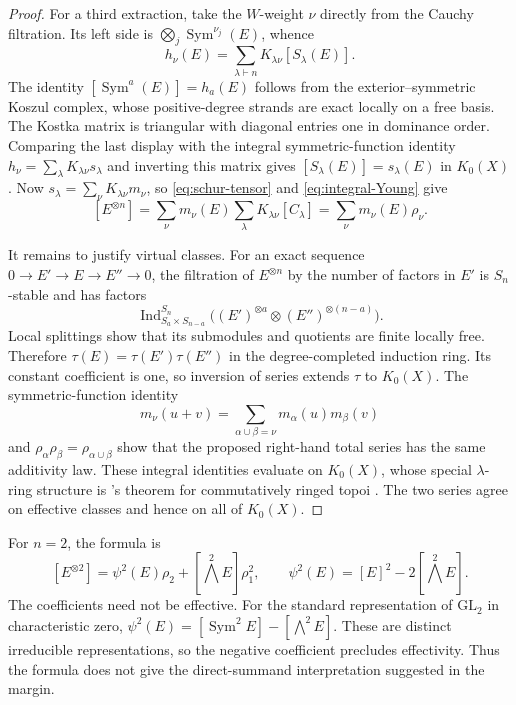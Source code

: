 \begin{proof}
For a third extraction, take the $W$-weight $\nu$ directly from
the Cauchy filtration.  Its left side is
$\bigotimes_j\operatorname{Sym}^{\nu_j}(E)$, whence
\[
 h_\nu(E)=\sum_{\lambda\vdash n}K_{\lambda\nu}[S_\lambda(E)].
\]
The identity $[\operatorname{Sym}^a(E)]=h_a(E)$ follows from
the exterior--symmetric Koszul complex, whose positive-degree
strands are exact locally on a free basis.  The Kostka matrix is
triangular with diagonal entries one in dominance order.  Comparing
the last display with the integral symmetric-function identity
$h_\nu=\sum_\lambda K_{\lambda\nu}s_\lambda$ and inverting this
matrix gives $[S_\lambda(E)]=s_\lambda(E)$ in $K_0(X)$.
Now $s_\lambda=\sum_\nu K_{\lambda\nu}m_\nu$, so
\eqref{eq:schur-tensor} and \eqref{eq:integral-Young} give
\[
 [E^{\otimes n}]
 =\sum_\nu m_\nu(E)\sum_\lambda K_{\lambda\nu}[C_\lambda]
 =\sum_\nu m_\nu(E)\rho_\nu.
\]

It remains to justify virtual classes.  For an exact sequence
$0\to E'\to E\to E''\to0$, the filtration of $E^{\otimes n}$
by the number of factors in $E'$ is $S_n$-stable and has factors
\[
 \operatorname{Ind}_{S_a\times S_{n-a}}^{S_n}
 \bigl((E')^{\otimes a}\otimes(E'')^{\otimes(n-a)}\bigr).
\]
Local splittings show that its submodules and quotients are
finite locally free.  Therefore $\tau(E)=\tau(E')\tau(E'')$
in the degree-completed induction ring.  Its constant coefficient
is one, so inversion of series extends $\tau$ to $K_0(X)$.
The symmetric-function identity
\[
 m_\nu(u+v)=\sum_{\alpha\cup\beta=\nu}m_\alpha(u)m_\beta(v)
\]
and $\rho_\alpha\rho_\beta=\rho_{\alpha\cup\beta}$ show that
the proposed right-hand total series has the same additivity
law.  These integral identities evaluate on $K_0(X)$, whose
special $\lambda$-ring structure is
\citeauthor{SGA6}'s theorem for commutatively ringed topoi
\citep[Expos\'e~VI, Theorem~3.3, pp.~392--393]{SGA6}.
The two series agree on effective classes and hence on all of
$K_0(X)$.
\end{proof}

For $n=2$, the formula is
\[
 [E^{\otimes2}]=\psi^2(E)\rho_2+
 [\bigwedge^2E]\rho_1^2,
 \qquad\psi^2(E)=[E]^2-2[\bigwedge^2E].
\]
The coefficients need not be effective.  For the standard
representation of $\mathrm{GL}_2$ in characteristic zero,
$\psi^2(E)=[\operatorname{Sym}^2E]-[\bigwedge^2E]$.
These are distinct irreducible representations, so the negative
coefficient precludes effectivity.  Thus the formula does not
give the direct-summand interpretation suggested in the margin.
